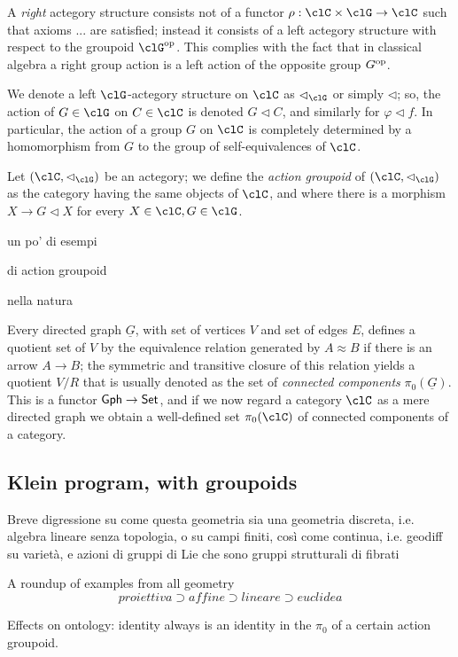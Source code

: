 \begin{remark}
  A \emph{right} actegory structure consists not of a functor $\rho : \clC \times \clG \to \clC$ such that axioms ... are satisfied; instead it consists of a left actegory structure with respect to the groupoid $\clG^\op$. This complies with the fact that in classical algebra a right group action is a left action of the opposite group $G^{\text{op}}$.
\end{remark}
\begin{notation}
  We denote a left $\clG$-actegory structure on $\clC$ as $\lhd_\clG$ or simply $\lhd$; so, the action of $G \in\clG$ on $C \in \clC$ is denoted $G\lhd C$, and similarly for $\varphi\lhd f$. In particular, the action of a group $G$ on $\clC$ is completely determined by a homomorphism from $G$ to the group of self-equivalences of $\clC$.
\end{notation}
\begin{definition}
Let $(\clC,\lhd_\clG)$ be an actegory; we define the \emph{action groupoid} of $(\clC,\lhd_\clG)$ as the category having the same objects of $\clC$, and where there is a morphism $X\to G\lhd X$ for every $X\in\clC, G\in\clG$.
\end{definition}
\begin{example}
un po' di esempi
\end{example}
\begin{example}
di action groupoid
\end{example}
\begin{example}
nella natura
\end{example}
\begin{definition}
Every directed graph $\underline G$, with set of vertices $V$ and set of edges $E$, defines a quotient set of $V$ by the equivalence relation generated by $A\approx B$ if there is an arrow $A\to B$; the symmetric and transitive closure of this relation yields a quotient $V/R$ that is usually denoted as the set of \emph{connected components} $\pi_0(\underline G)$. This is a functor ${\sf Gph} \to \mathsf{Set}$, and if we now regard a category $\clC$ as a mere directed graph we obtain a well-defined set $\pi_0(\clC)$ of connected components of a category.
\end{definition}
\subsection{Klein program, with groupoids}
\begin{remark}
Breve digressione su come questa geometria sia una geometria discreta, i.e. algebra lineare senza topologia, o su campi finiti, così come continua, i.e. geodiff su varietà, e azioni di gruppi di Lie che sono gruppi strutturali di fibrati
\end{remark}
\begin{example}
  A roundup of examples from all geometry
\[proiettiva \supset affine \supset lineare \supset euclidea\]
\end{example}
Effects on ontology: identity always is an identity in the $\pi_0$ of a certain action groupoid.